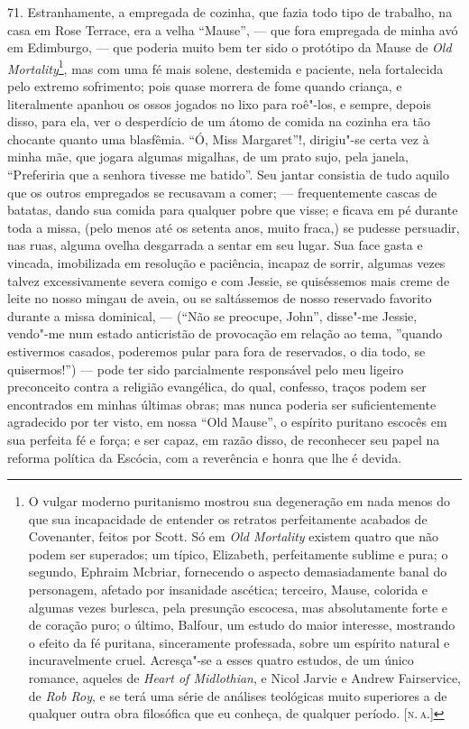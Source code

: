 71. Estranhamente, a empregada de cozinha, que fazia todo tipo de
trabalho, na casa em Rose Terrace, era a velha ``Mause'', --- que fora
empregada de minha avó em Edimburgo, --- que poderia muito bem ter sido o
protótipo da Mause de \emph{Old} \emph{Mortality}\footnote{O vulgar
  moderno puritanismo mostrou sua degeneração em nada menos do que sua
  incapacidade de entender os retratos perfeitamente acabados de
  Covenanter, feitos por Scott. Só em \emph{Old Mortality} existem
  quatro que não podem ser superados; um típico, Elizabeth,
  perfeitamente sublime e pura; o segundo, Ephraim Mcbriar, fornecendo o
  aspecto demasiadamente banal do personagem, afetado por insanidade
  ascética; terceiro, Mause, colorida e algumas vezes burlesca, pela
  presunção escocesa, mas absolutamente forte e de coração puro; o
  último, Balfour, um estudo do maior interesse, mostrando o efeito da
  fé puritana, sinceramente professada, sobre um espírito natural e
  incuravelmente cruel. Acresça"-se a esses quatro estudos, de um único
  romance, aqueles de \emph{Heart of Midlothian}, e Nicol Jarvie e
  Andrew Fairservice, de \emph{Rob Roy}, e se terá uma série de análises
  teológicas muito superiores a de qualquer outra obra filosófica que eu
  conheça, de qualquer período. {[}\textsc{n.\,a.}{]}}, mas com uma fé
mais solene, destemida e paciente, nela fortalecida pelo extremo
sofrimento; pois quase morrera de fome quando criança, e literalmente
apanhou os ossos jogados no lixo para roê"-los, e sempre, depois disso,
para ela, ver o desperdício de um átomo de comida na cozinha era tão
chocante quanto uma blasfêmia. ``Ó, Miss Margaret''!, dirigiu"-se certa
vez à minha mãe, que jogara algumas migalhas, de um prato sujo, pela
janela, ``Preferiria que a senhora tivesse me batido''. Seu jantar
consistia de tudo aquilo que os outros empregados se recusavam a comer;
--- frequentemente cascas de batatas, dando sua comida para qualquer pobre
que visse; e ficava em pé durante toda a missa, (pelo menos até os
setenta anos, muito fraca,) se pudesse persuadir, nas ruas, alguma
ovelha desgarrada a sentar em seu lugar. Sua face gasta e vincada,
imobilizada em resolução e paciência, incapaz de sorrir, algumas vezes
talvez excessivamente severa comigo e com Jessie, se quiséssemos mais
creme de leite no nosso mingau de aveia, ou se saltássemos de nosso
reservado favorito durante a missa dominical, --- (``Não se preocupe,
John'', disse"-me Jessie, vendo"-me num estado anticristão de provocação
em relação ao tema, ''quando estivermos casados, poderemos pular para
fora de reservados, o dia todo, se quisermos!'') --- pode ter sido
parcialmente responsável pelo meu ligeiro preconceito contra a religião
evangélica, do qual, confesso, traços podem ser encontrados em minhas
últimas obras; mas nunca poderia ser suficientemente agradecido por ter
visto, em nossa ``Old Mause'', o espírito puritano escocês em sua
perfeita fé e força; e ser capaz, em razão disso, de reconhecer seu
papel na reforma política da Escócia, com a reverência e honra que lhe é
devida.

